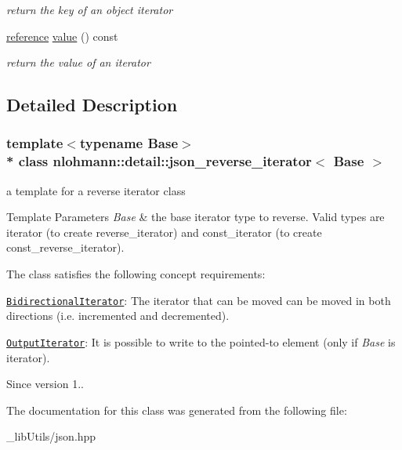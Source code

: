 \begin{DoxyCompactItemize}
\begin{DoxyCompactList}\small\item\em return the key of an object iterator \end{DoxyCompactList}\item 
\hyperlink{classnlohmann_1_1detail_1_1json__reverse__iterator_a42f51a69bac7b2aebb613b2164e457f1}{reference} \hyperlink{classnlohmann_1_1detail_1_1json__reverse__iterator_a4c4e94317f95315f95e9909cf8d65dbf}{value} () const \hypertarget{classnlohmann_1_1detail_1_1json__reverse__iterator_a4c4e94317f95315f95e9909cf8d65dbf}{}\label{classnlohmann_1_1detail_1_1json__reverse__iterator_a4c4e94317f95315f95e9909cf8d65dbf}

\begin{DoxyCompactList}\small\item\em return the value of an iterator \end{DoxyCompactList}\end{DoxyCompactItemize}


\subsection{Detailed Description}
\subsubsection*{template$<$typename Base$>$\\*
class nlohmann\+::detail\+::json\+\_\+reverse\+\_\+iterator$<$ Base $>$}

a template for a reverse iterator class 


\begin{DoxyTemplParams}{Template Parameters}
{\em Base} & the base iterator type to reverse. Valid types are iterator (to create reverse\+\_\+iterator) and const\+\_\+iterator (to create const\+\_\+reverse\+\_\+iterator).\\
\hline
\end{DoxyTemplParams}
The class satisfies the following concept requirements\+:
\begin{DoxyItemize}
\item \href{http://en.cppreference.com/w/cpp/concept/BidirectionalIterator}{\tt Bidirectional\+Iterator}\+: The iterator that can be moved can be moved in both directions (i.\+e. incremented and decremented).
\item \href{http://en.cppreference.com/w/cpp/concept/OutputIterator}{\tt Output\+Iterator}\+: It is possible to write to the pointed-\/to element (only if {\itshape Base} is iterator).
\end{DoxyItemize}

\begin{DoxySince}{Since}
version 1.. 
\end{DoxySince}


The documentation for this class was generated from the following file\+:\begin{DoxyCompactItemize}
\item 
\+\_\+lib\+Utils/json.\+hpp\end{DoxyCompactItemize}

